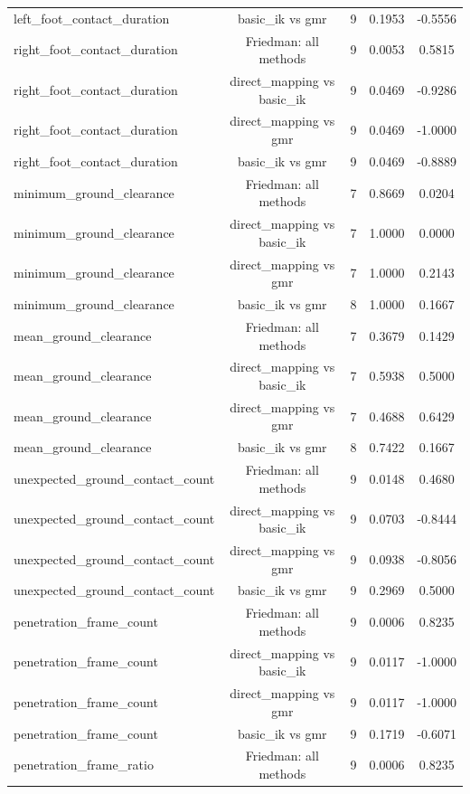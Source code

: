 \begin{table}[t]
{\begin{tabular}{lcccc}
left\_foot\_contact\_duration & basic\_ik vs gmr & 9 & 0.1953 & -0.5556 \\
right\_foot\_contact\_duration & Friedman: all methods & 9 & 0.0053 & 0.5815 \\
right\_foot\_contact\_duration & direct\_mapping vs basic\_ik & 9 & 0.0469 & -0.9286 \\
right\_foot\_contact\_duration & direct\_mapping vs gmr & 9 & 0.0469 & -1.0000 \\
right\_foot\_contact\_duration & basic\_ik vs gmr & 9 & 0.0469 & -0.8889 \\
minimum\_ground\_clearance & Friedman: all methods & 7 & 0.8669 & 0.0204 \\
minimum\_ground\_clearance & direct\_mapping vs basic\_ik & 7 & 1.0000 & 0.0000 \\
minimum\_ground\_clearance & direct\_mapping vs gmr & 7 & 1.0000 & 0.2143 \\
minimum\_ground\_clearance & basic\_ik vs gmr & 8 & 1.0000 & 0.1667 \\
mean\_ground\_clearance & Friedman: all methods & 7 & 0.3679 & 0.1429 \\
mean\_ground\_clearance & direct\_mapping vs basic\_ik & 7 & 0.5938 & 0.5000 \\
mean\_ground\_clearance & direct\_mapping vs gmr & 7 & 0.4688 & 0.6429 \\
mean\_ground\_clearance & basic\_ik vs gmr & 8 & 0.7422 & 0.1667 \\
unexpected\_ground\_contact\_count & Friedman: all methods & 9 & 0.0148 & 0.4680 \\
unexpected\_ground\_contact\_count & direct\_mapping vs basic\_ik & 9 & 0.0703 & -0.8444 \\
unexpected\_ground\_contact\_count & direct\_mapping vs gmr & 9 & 0.0938 & -0.8056 \\
unexpected\_ground\_contact\_count & basic\_ik vs gmr & 9 & 0.2969 & 0.5000 \\
penetration\_frame\_count & Friedman: all methods & 9 & 0.0006 & 0.8235 \\
penetration\_frame\_count & direct\_mapping vs basic\_ik & 9 & 0.0117 & -1.0000 \\
penetration\_frame\_count & direct\_mapping vs gmr & 9 & 0.0117 & -1.0000 \\
penetration\_frame\_count & basic\_ik vs gmr & 9 & 0.1719 & -0.6071 \\
penetration\_frame\_ratio & Friedman: all methods & 9 & 0.0006 & 0.8235 \\

\end{tabular}}
\end{table}
